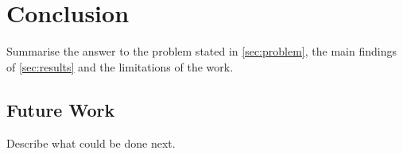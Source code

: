 \section{Conclusion}\label{sec:conclusion}

Summarise the answer to the problem stated in \cref{sec:problem}, the main findings of \cref{sec:results} and the limitations of the work.

\subsection{Future Work}\label{sec:future-work}
Describe what could be done next.
